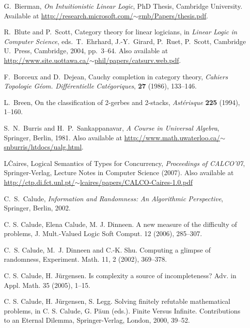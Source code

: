 \documentclass[12pt,twoside,openright]{report}
\begin{document}
\begin{thebibliography}{99}
 G.\ Bierman, {\sl On Intuitionistic Linear Logic}, PhD Thesis, Cambridge University.  Available at 
\href{http://research.microsoft.com/~gmb/Papers/thesis.pdf}
{http://research.microsoft.com/$\sim$gmb/Papers/thesis.pdf}.

 R.\ Blute and P.\ Scott, Category theory for linear logicians, in {\sl Linear Logic in Computer Science}, eds.\
T.\ Ehrhard, J.-Y.\ Girard, P.\ Ruet, P.\ Scott, Cambridge U.\ Press, Cambridge, 2004, pp.\ 3--64.  Also available at 
\href{http://www.site.uottawa.ca/~phil/papers/catsurv.web.pdf}
{http://www.site.uottawa.ca/$\sim$phil/papers/catsurv.web.pdf}.

 F.\ Borceux and D.\ Dejean, Cauchy completion in category theory, \textsl{Cahiers Topologie G\'eom. Diff\'erentielle Cat\'egoriques}, \textbf{27} (1986), 133--146.

 L.\ Breen, On the classification of 2-gerbes and 2-stacks, \textsl{Ast\'erisque} \textbf{225} (1994), 1--160.

 S.\ N.\ Burris and H.\ P.\ Sankappanavar,
{\sl A Course in Universal Algebra}, Springer, Berlin, 1981.  Also available at \href{http://www.math.uwaterloo.ca/~snburris/htdocs/ualg.html}
{http://www.math.uwaterloo.ca/$\sim$snburris/htdocs/ualg.html}.

 L\. Caires, Logical Semantics of Types for Concurrency, \textsl{Proceedings of CALCO'07}, Springer-Verlag, Lecture Notes in Computer Science (2007).  Also available at \href{http://ctp.di.fct.unl.pt/~lcaires/papers/CALCO-Caires-1.0.pdf}{http://ctp.di.fct.unl.pt/$\sim$lcaires/papers/CALCO-Caires-1.0.pdf}

 C.\ S.\ Calude, {\sl Information and Randomness: 
An Algorithmic Perspective}, Springer, Berlin, 2002.

C. S. Calude, Elena Calude, M. J. Dinneen. A new measure of the difficulty  of  problems,  J. Mult.-Valued Logic Soft Comput. 12 (2006), 285--307.

 C.~S. Calude, M.~J. Dinneen and C.-K. Shu. Computing a glimpse of randomness,  Experiment. Math. 11, 2 (2002), 369--378. 
 
 
 C. S. Calude, H. J{\"u}rgensen.  Is complexity a source of incompleteness? Adv.  in Appl. Math. 35 (2005), 1--15.

 C. S. Calude, H. J\"{u}rgensen, S. Legg. Solving finitely refutable mathematical problems, in C. S. Calude, G. P\u{a}un (eds.).  Finite Versus Infinite.  Contributions to an Eternal Dilemma, Springer-Verlag, London, 2000, 39--52.


\end{thebibliography}
\end{document}
